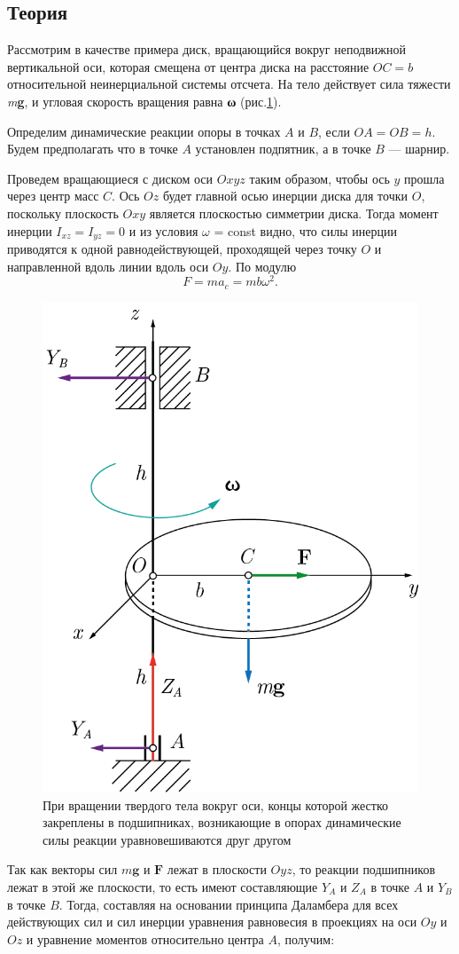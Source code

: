 \documentclass[All.tex]{subfiles}
\begin{document}
\subsection*{\textcolor{PineGreen}{Теория}}

Рассмотрим в качестве примера диск, вращающийся вокруг неподвижной вертикальной оси, которая смещена от центра диска на расстояние $ OC=b $ относительной неинерциальной системы отсчета. 
На тело действует сила тяжести \textit{m}\textbf{g}, и угловая скорость вращения равна \textbf{ω} (рис.\ref{freeaxis-5}).

Определим динамические реакции опоры в точках $ A $ и $ B $, если $ OA = OB = h $.
Будем предполагать что в точке $ A $ установлен подпятник, а в точке $ B $ — шарнир.

Проведем вращающиеся с диском оси $ Oxyz $ таким образом, чтобы ось $ y $ прошла через центр масс $ C $.
Ось $ Oz $ будет главной осью инерции диска для точки $ O $, поскольку плоскость $ Oxy $ является плоскостью симметрии диска.
Тогда момент инерции $ I_{xz} = I_{yz} = 0 $ и из условия $ \omega $ = const видно, что силы инерции приводятся к одной равнодействующей, проходящей через точку $ O $ и направленной вдоль линии вдоль оси $Oy$.
По модулю $$ F = ma_{c} = mb\omega^{2}. $$

\begin{figure}[H] 	
	\centering 		
	\includegraphics[width=0.45\linewidth]{freeaxis-5.png}
	\caption{При вращении твердого тела вокруг оси, концы которой жестко закреплены в подшипниках, возникающие в опорах динамические силы реакции уравновешиваются друг другом}
	\label{freeaxis-5}
\end{figure}

Так как векторы сил $ m\textbf{g} $ и $ \textbf{F} $ лежат в плоскости $ Oyz $, то реакции подшипников лежат в этой же плоскости, то есть имеют составляющие $ Y_{A} $ и $ Z_{A} $ в точке $ A $ и $ Y_{B} $ в точке $ B $. 
Тогда, составляя на основании принципа Даламбера для всех действующих сил и сил инерции уравнения равновесия в проекциях на оси $ Oy $ и $ Oz $ и уравнение моментов относительно центра $ A $, получим:
\end{document}
